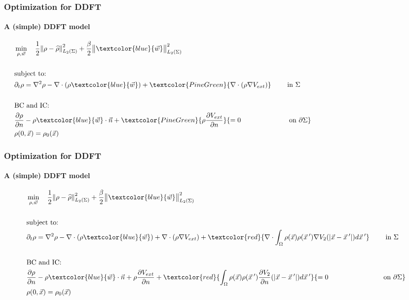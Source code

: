 \documentclass[aspectratio=169,xcolor=dvipsnames]{beamer}
\begin{document}
\begin{frame}
	\frametitle{Optimization for DDFT}
	\framesubtitle{A (simple) DDFT model}
	\begin{align*}
		&\min_{\rho,\vec{w}} \quad \frac{1}{2}\norm{\rho- \widehat{\rho}}_{L_2(\Sigma)}^2 + \frac{\beta}{2} \norm{ \textcolor{blue}{\vec{w}}}_{L_2(\Sigma)}^2\\
		\\
		&\text{subject to:}
		\\
		& \partial_t \rho = \nabla^2 \rho - \nabla \cdot (\rho  \textcolor{blue}{\vec{w}}) + \textcolor{PineGreen}{\nabla \cdot \left(\rho \nabla V_{ext} \right)}  \qquad \ { \text{in    } \Sigma}\qquad \qquad \qquad\qquad \qquad \qquad\qquad \qquad \quad\\
		\\
		&{\text{BC } \text{and IC:}}\\
		&\frac{\partial \rho}{\partial n} - \rho  \textcolor{blue}{\vec{w}} \cdot \vec{n}  + \textcolor{PineGreen}{\rho \frac{\partial V_{ext}}{\partial n}} {= 0 \quad \quad \qquad \qquad \quad \text{on   } \partial \Sigma  } \qquad \qquad \qquad \qquad \\
		&{\rho(0,\vec{x}) = \rho_0(\vec{x})} 
	\end{align*}
	
\end{frame}
\begin{frame}
	\frametitle{Optimization for DDFT}
	\framesubtitle{A (simple) DDFT model}
	\begin{align*}
		&\min_{\rho,\vec{w}} \quad \frac{1}{2}\norm{\rho- \widehat{\rho}}_{L_2(\Sigma)}^2 + \frac{\beta}{2} \norm{ \textcolor{blue}{\vec{w}}}_{L_2(\Sigma)}^2\\
		\\
		&\text{subject to:}
		\\
		& \partial_t \rho = \nabla^2 \rho - \nabla \cdot (\rho  \textcolor{blue}{\vec{w}}) + \nabla \cdot \left(\rho \nabla V_{ext} \right) + \textcolor{red}{\nabla \cdot \int_\Omega \rho(\vec{x}) \rho(\vec{x}\hspace{0.2em}') \nabla V_2(|\vec{x}-\vec{x}\hspace{0.2em}'|)d\vec{x}\hspace{0.2em}'} \qquad \ { \text{in    } \Sigma}\\
		\\
		&{\text{BC } \text{and IC:}}\\
		&\frac{\partial \rho}{\partial n} - \rho  \textcolor{blue}{\vec{w}} \cdot \vec{n}  + \rho \frac{\partial V_{ext}}{\partial n} + \textcolor{red}{ \int_\Omega \rho(\vec{x}) \rho(\vec{x}\hspace{0.2em}')  \frac{ \partial  V_2}{\partial n}(|\vec{x}-\vec{x}\hspace{0.2em}'|)d\vec{x}\hspace{0.2em}'} {= 0 \quad \ \ \ \quad \qquad \qquad \quad \text{on   } \partial \Sigma  } \\
		&{\rho(0,\vec{x}) = \rho_0(\vec{x})} 
	\end{align*}
	
\end{frame}
\end{document}
